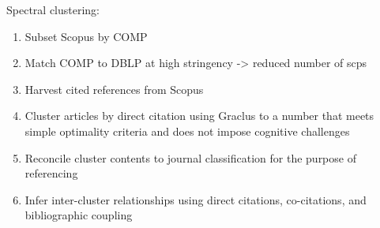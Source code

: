 \noindent
 Spectral clustering:
\begin{enumerate}
\item Subset Scopus by COMP
\item Match COMP to DBLP at high stringency -> reduced number of scps
 \item Harvest cited references  from Scopus
 \item Cluster articles by direct citation using Graclus to a number that meets simple optimality criteria and does not impose cognitive challenges
 \item Reconcile cluster contents to journal classification for the purpose of referencing
 \item Infer inter-cluster relationships using direct citations, co-citations, and bibliographic coupling
\end{enumerate}



